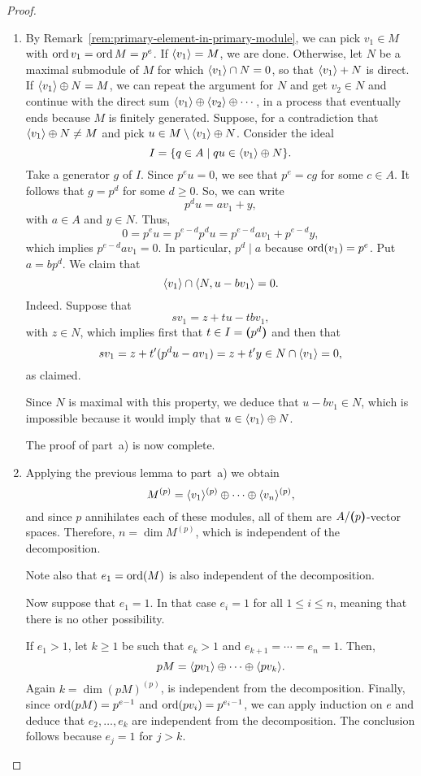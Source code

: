 \begin{proof}${}$
    \begin{enumerate}[\rm a)]
        \item By Remark~\ref{rem:primary-element-in-primary-module}, we can pick $v_1\in M$ with $\operatorname{ord}{v_1}=\operatorname{ord}{M}=p^e$. If $\langle v_1\rangle=M$, we are done. Otherwise, let $N$ be a maximal submodule of $M$ for which $\langle v_1\rangle\cap N=0$, so that $\langle v_1\rangle+N$ is direct. If $\langle v_1\rangle\oplus N=M$, we can repeat the argument for $N$ and get $v_2\in N$ and continue with the direct sum $\langle v_1\rangle\oplus\langle v_2\rangle\oplus\cdots$, in a process that eventually ends because $M$ is finitely generated. Suppose, for a contradiction that $\langle v_1\rangle\oplus N\ne M$ and pick $u\in M\setminus\langle v_1\rangle\oplus N$. Consider the ideal
        $$
            I = \{q\in A\mid qu\in\langle v_1\rangle\oplus N\}.
        $$
        Take a generator $g$ of $I$. Since $p^eu=0$, we see that $p^e=cg$ for some $c\in A$. It follows that $g=p^d$ for some $d\ge0$. So, we can write
        $$
            p^du = av_1+y,
        $$
        with $a\in A$ and $y\in N$. Thus,
        $$
            0 = p^eu = p^{e-d}p^du= p^{e-d}av_1+p^{e-d}y,
        $$
        which implies $p^{e-d}av_1=0$. In particular, $p^d\mid a$ because $\operatorname{ord}(v_1)=p^e$. Put $a=bp^d$. We claim that
        $$
            \langle v_1\rangle\cap\langle N,u-bv_1\rangle=0.
        $$
        Indeed. Suppose that
        $$
            sv_1 = z+tu-tbv_1,
        $$
        with $z\in N$, which implies first that $t\in I=\textrm{\boldmath$($}p^d\textrm{\boldmath$)$}$ and then that
        $$
            sv_1 = z+t'(p^du-av_1)=z+t'y\in N\cap\langle v_1\rangle=0,
        $$
        as claimed.
        
        Since $N$ is maximal with this property, we deduce that $u-bv_1\in N$, which is impossible because it would imply that $u\in\langle v_1\rangle\oplus N$.

        The proof of part~a) is now complete.

        \item Applying the previous lemma to part~a) we obtain
        $$
            M^{(p)} = \langle v_1\rangle^{(p)}\oplus\cdots\oplus
                \langle v_n\rangle^{(p)},
        $$
        and since $p$ annihilates each of these modules, all of them are $A/\textrm{\boldmath$($}p\textrm{\boldmath$)$}$-vector spaces. Therefore, $n=\dim M^{(p)}$, which is independent of the decomposition.

        Note also that $e_1=\operatorname{ord}(M)$ is also independent of the decomposition.
        
        Now suppose that $e_1=1$. In that case $e_i=1$ for all $1\le i\le n$, meaning that there is no other possibility.

        If $e_1>1$, let $k\ge1$ be such that $e_k>1$ and $e_{k+1}=\cdots=e_n=1$. Then,
        $$
            pM = \langle pv_1\rangle\oplus\cdots\oplus\langle pv_k\rangle.
        $$
        Again $k=\dim(pM)^{(p)}$, is independent from the decomposition. Finally, since $\operatorname{ord}(pM)=p^{e-1}$ and $\operatorname{ord}(pv_i)=p^{e_i-1}$, we can apply induction on $e$ and deduce that $e_2,\dots,e_k$ are independent from the decomposition. The conclusion follows because $e_j=1$ for $j>k$.
    \end{enumerate}
\end{proof}

